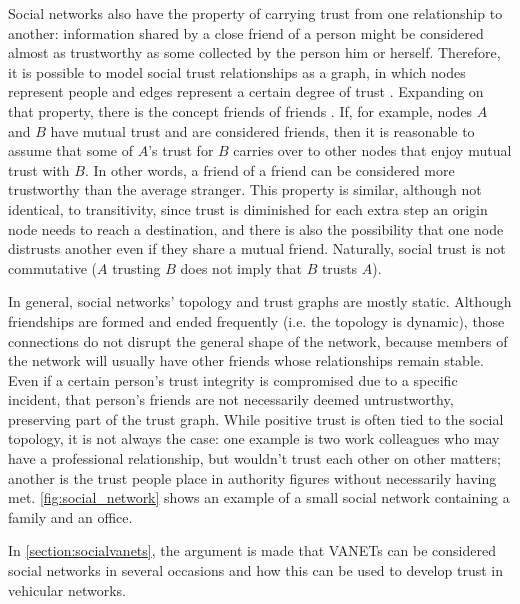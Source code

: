 
Social networks also have the property of carrying trust from one relationship to another:
information shared by a close friend of a person might be considered almost as trustworthy as some collected by the person him or herself.
Therefore, it is possible to model social trust relationships as a graph, in which nodes represent people and edges represent a certain degree of trust \cite{newmannetworks}.
Expanding on that property, there is the concept friends of friends \cite{boissevain1974friends}.
If, for example, nodes $A$ and $B$ have mutual trust and are considered friends, then it is reasonable to assume that some of $A$'s trust for $B$ carries over to other nodes that enjoy mutual trust with $B$.
In other words, a friend of a friend can be considered more trustworthy than the average stranger.
This property is similar, although not identical, to transitivity, since trust is diminished for each extra step an origin node needs to reach a destination, and there is also the possibility that one node distrusts another even if they share a mutual friend.
Naturally, social trust is not commutative ($A$ trusting $B$ does not imply that $B$ trusts $A$).

In general, social networks' topology and trust graphs are mostly static.
Although friendships are formed and ended frequently (i.e. the topology is dynamic), those connections do not disrupt the general shape of the network, because members of the network will usually have other friends whose relationships remain stable.
Even if a certain person's trust integrity is compromised due to a specific incident, that person's friends are not necessarily deemed untrustworthy, preserving part of the trust graph.
While positive trust is often tied to the social topology, it is not always the case: one example is two work colleagues who may have a professional relationship, but wouldn't trust each other on other matters; another is the trust people place in authority figures without necessarily having met. 
\autoref{fig:social_network} shows an example of a small social network containing a family and an office. 

In \autoref{section:socialvanets}, the argument is made that VANETs can be considered social networks in several occasions and how this can be used to develop trust in vehicular networks. 



